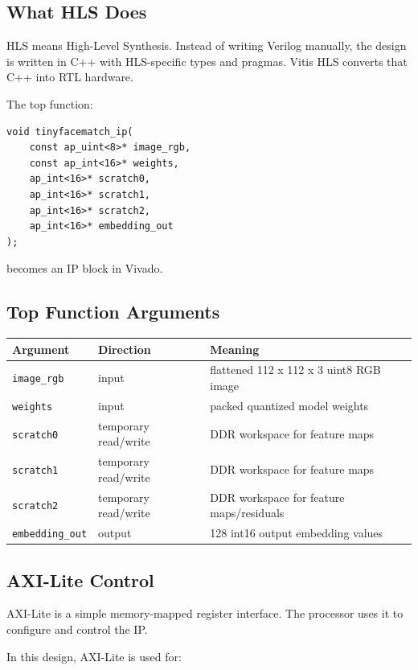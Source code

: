 \documentclass[11pt]{article}
\newcommand{\code}[1]{\texttt{#1}}
\begin{document}
\subsection{What HLS Does}

HLS means High-Level Synthesis.
Instead of writing Verilog manually, the design is written in C++ with HLS-specific types and pragmas.
Vitis HLS converts that C++ into RTL hardware.

The top function:

\begin{lstlisting}
void tinyfacematch_ip(
    const ap_uint<8>* image_rgb,
    const ap_int<16>* weights,
    ap_int<16>* scratch0,
    ap_int<16>* scratch1,
    ap_int<16>* scratch2,
    ap_int<16>* embedding_out
);
\end{lstlisting}

becomes an IP block in Vivado.

\subsection{Top Function Arguments}

\begin{center}
\begin{tabular}{lll}
\toprule
Argument & Direction & Meaning \\
\midrule
\code{image\_rgb} & input & flattened 112 x 112 x 3 uint8 RGB image \\
\code{weights} & input & packed quantized model weights \\
\code{scratch0} & temporary read/write & DDR workspace for feature maps \\
\code{scratch1} & temporary read/write & DDR workspace for feature maps \\
\code{scratch2} & temporary read/write & DDR workspace for feature maps/residuals \\
\code{embedding\_out} & output & 128 int16 output embedding values \\
\bottomrule
\end{tabular}
\end{center}

\subsection{AXI-Lite Control}

AXI-Lite is a simple memory-mapped register interface.
The processor uses it to configure and control the IP.

In this design, AXI-Lite is used for:
\end{document}
